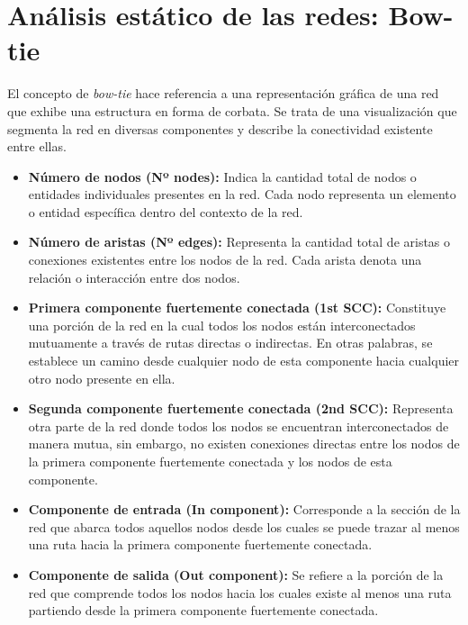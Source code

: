 
\section {Análisis estático de las redes: Bow-tie}

El concepto de \textit{bow-tie} \cite{enwiki:1148363387} hace referencia a una representación gráfica de una red
que exhibe una estructura en forma de corbata. Se trata de una visualización que segmenta
la red en diversas componentes y describe la conectividad existente entre ellas.

\begin{itemize}
    \item \textbf{Número de nodos (Nº nodes):} Indica la cantidad total de nodos o entidades individuales presentes en la red. Cada nodo representa un elemento o entidad específica dentro del contexto de la red.

    \item \textbf{Número de aristas (Nº edges):} Representa la cantidad total de aristas o conexiones existentes entre los nodos de la red. Cada arista denota una relación o interacción entre dos nodos.

    \item \textbf{Primera componente fuertemente conectada (1st SCC):} Constituye una porción de la red en la cual todos los nodos están interconectados mutuamente a través de rutas directas o indirectas. En otras palabras, se establece un camino desde cualquier nodo de esta componente hacia cualquier otro nodo presente en ella.

    \item \textbf{Segunda componente fuertemente conectada (2nd SCC):} Representa otra parte de la red donde todos los nodos se encuentran interconectados de manera mutua, sin embargo, no existen conexiones directas entre los nodos de la primera componente fuertemente conectada y los nodos de esta componente.

    \item \textbf{Componente de entrada (In component):} Corresponde a la sección de la red que abarca todos aquellos nodos desde los cuales se puede trazar al menos una ruta hacia la primera componente fuertemente conectada.

    \item \textbf{Componente de salida (Out component):} Se refiere a la porción de la red que comprende todos los nodos hacia los cuales existe al menos una ruta partiendo desde la primera componente fuertemente conectada.


\end{itemize}
